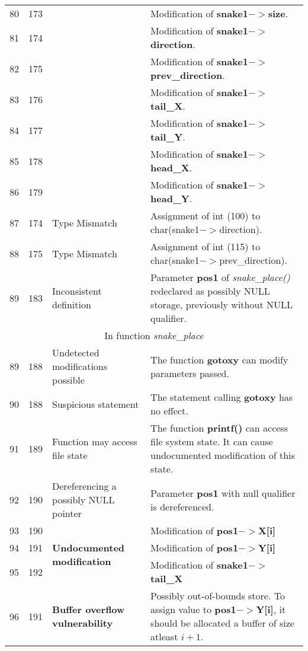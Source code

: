 \documentclass[]{article}
\begin{document}
\begin{longtable}{ |p{0.5cm}|p{0.75cm}|p{3cm}|p{9cm}|  }
		80 & 173 & & Modification of \textbf{snake1$->$size}. \\
		81 & 174 & & Modification of \textbf{snake1$->$direction}. \\
		82 & 175 & & Modification of \textbf{snake1$->$prev\_direction}. \\
		83 & 176 & & Modification of \textbf{snake1$->$tail\_X}. \\
		84 & 177 & & Modification of \textbf{snake1$->$tail\_Y}. \\
		85 & 178 & & Modification of \textbf{snake1$->$head\_X}. \\
		86 & 179 & & Modification of \textbf{snake1$->$head\_Y}. \\
		\hline 
		87 & 174 & Type Mismatch & Assignment of int (100) to char(snake1$->$direction). \\
		\hline 
		88 & 175 & Type Mismatch & Assignment of int (115) to char(snake1$->$prev\_direction). \\
		\hline 
		89 & 183 & Inconsistent definition & Parameter \textbf{pos1} of \textit{snake\_place()} redeclared as possibly NULL storage, previously without NULL qualifier. \\
		\hline 
		\multicolumn{4}{|c|}{In function \textit{snake\_place}} \\
		\hline 
		89 & 188 & Undetected modifications possible & The function \textbf{gotoxy} can modify parameters passed. \\
		\hline 
		90 & 188 & Suspicious statement & The statement calling \textbf{gotoxy} has no effect. \\
		\hline 
		91 & 189 & Function may access file state & The function \textbf{printf()} can access file system state. It can cause undocumented modification of this state. \\
		\hline 
		92 & 190 & Dereferencing a possibly NULL pointer & Parameter \textbf{pos1} with null qualifier is dereferenced. \\
		\hline 
		93 & 190 & \multirow{3}{90.0pt}{\textbf{Undocumented modification}} & Modification of \textbf{pos1$->$X[i]} \\
		94 & 191 & & Modification of \textbf{pos1$->$Y[i]} \\ 
		95 & 192 & & Modification of \textbf{snake1$->$tail\_X} \\
		\hline 
		96 & 191 & \textbf{Buffer overflow vulnerability} & Possibly out-of-bounds store. To assign value to \textbf{pos1$->$Y[i]}, it should be allocated a buffer of size atleast $i + 1$.  \\
		

\end{longtable}
\end{document}
